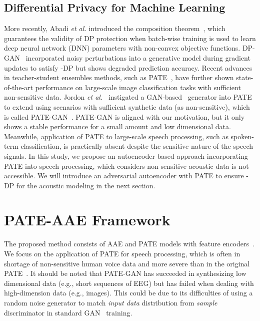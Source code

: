\documentclass[a4paper]{article}
\begin{document}
\subsection{Differential Privacy for Machine Learning}

More recently,  Abadi \emph{et al.} \cite{abadi2016deep} introduced the composition theorem~\cite{dwork2010boosting}, which guarantees the validity of DP protection when batch-wise training is used to learn deep neural network (DNN) parameters with non-convex objective functions. DP-GAN~\cite{xie2018differentially} incorporated noisy perturbations into a generative model during gradient updates to satisfy -DP but shows degraded prediction accuracy. Recent advances in teacher-student ensembles methods, such as PATE~\cite{papernot2016semi, papernot2018scalable}, have further shown state-of-the-art performance on large-scale image classification tasks with sufficient non-sensitive data. Jordon \emph{et al.}~\cite{jordon2019pate} instigated a GAN-based~\cite{goodfellow2014generative} generator into PATE to extend using scenarios with sufficient synthetic data (as non-sensitive), which is called PATE-GAN~\cite{jordon2019pate}. PATE-GAN is aligned with our motivation, but it only shows a stable performance for a small amount and low dimensional data.
Meanwhile, application of PATE to large-scale speech processing, such as spoken-term classification,
is practically absent despite the sensitive nature of the speech signals.
In this study, we propose an autoencoder based approach incorporating PATE into speech processing, which considers non-sensitive acoustic data is not accessible. We will introduce an adversarial autoencoder with PATE to ensure -DP for the acoustic modeling in the next section.











\section{PATE-AAE Framework}
The proposed method consists of AAE and PATE models with feature encoders~\cite{chorowski2019unsupervised}. We focus on the application of PATE for speech processing, which is often in shortage of non-sensitive human voice data and more severe than in the original PATE~\cite{papernot2016semi}. It should be noted that PATE-GAN has succeeded in synthesizing low dimensional data (e.g., short sequences of EEG) but has failed when dealing with high-dimension data (e.g., images). This could be due to its difficulties of using a random noise generator to match \emph{input data} distribution from \emph{sample} discriminator in standard GAN~\cite{goodfellow2014generative} training.
\end{document}
